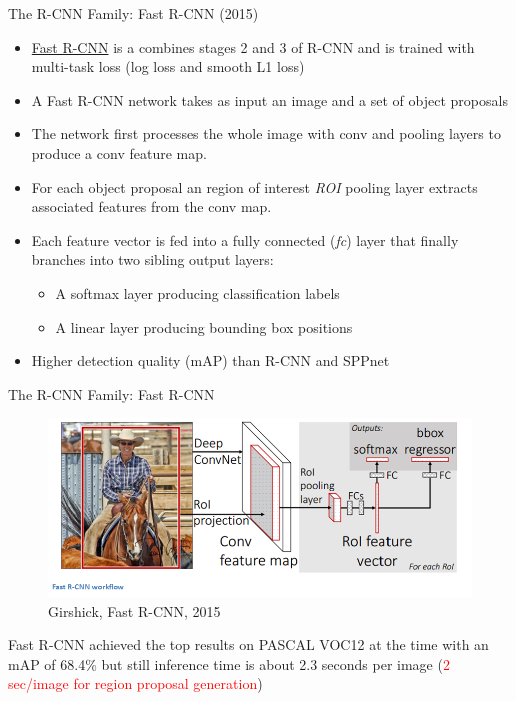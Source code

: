 \documentclass[handout]{beamer}
\begin{document}
\begin{frame}{The R-CNN Family: Fast R-CNN (2015)}
\begin{itemize}
\itemsep 0.8em
	\item<1->\href{https://arxiv.org/abs/1504.08083}{\color{blue}Fast R-CNN} is a combines stages 2 and 3 of R-CNN and is trained with multi-task loss (log loss and smooth L1 loss)
	\item<2->A Fast R-CNN network takes as input an image and a set of object proposals 
	\item<3->The network first processes the whole image with conv and pooling layers to produce a conv feature map.
	\item<4->For each object proposal an region of interest \emph{ROI} pooling layer extracts associated features from the conv map.
	\item<5->Each feature vector is fed into a fully connected (\emph{fc}) layer that finally branches into two sibling output layers:
	\begin{itemize}[square]
		\item<1->A softmax layer producing classification labels
		\item<2->A linear layer producing bounding box positions
	\end{itemize}
	\item<6->Higher detection quality (mAP) than R-CNN and SPPnet
\end{itemize}
\end{frame}

\begin{frame}{The R-CNN Family: Fast R-CNN}
\begin{figure}
	\includegraphics[width=\textwidth,keepaspectratio]{../media/fast-rcnn-diag.png}
	\caption{Girshick, Fast R-CNN, 2015}
\end{figure}
Fast R-CNN achieved the top results on PASCAL VOC12 at the time with an mAP of 68.4\% but still inference time is about 2.3 seconds per image (\textcolor{red}{2 sec/image for region proposal generation})
\end{frame}
\end{document}
